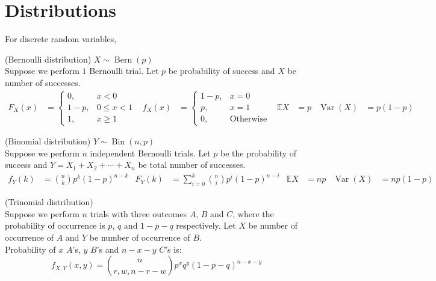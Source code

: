 \documentclass{huhtakm-template-book}
\newcommand{\expect}{\mathbb{E}}
\DeclareMathOperator{\Bern}{Bern}
\DeclareMathOperator{\Bin}{Bin}
\DeclareMathOperator{\Var}{Var}
\begin{document}
\section*{Distributions}
For discrete random variables,
\begin{seg}(Bernoulli distribution) $X\sim\Bern(p)$\\
	Suppose we perform $1$ Bernoulli trial. Let $p$ be probability of success and $X$ be number of successes.
	\begin{align*}
		F_{X}(x)&=\begin{cases}
			0, &x<0\\
			1-p, &0\leq x<1\\
			1, &x\geq 1
		\end{cases} & f_{X}(x)&=\begin{cases}
			1-p, &x=0\\
			p, &x=1\\
			0, &\text{Otherwise}
		\end{cases} & \expect X&=p & \Var(X)&=p(1-p)
	\end{align*}
\end{seg}
\begin{seg}(Binomial distribution) $Y\sim\Bin(n,p)$\\
	Suppose we perform $n$ independent Bernoulli trials. Let $p$ be the probability of success and $Y=X_{1}+X_{2}+\cdots+X_{n}$ be total number of successes.
	\begin{align*}
		f_{Y}(k)&=\binom{n}{k}p^{k}(1-p)^{n-k} & F_{Y}(k)&=\sum_{i=0}^{k}\binom{n}{i}p^{i}(1-p)^{n-i} & \expect X&=np & \Var(X)&=np(1-p)
	\end{align*}
\end{seg}
\begin{seg}(Trinomial distribution)\\
	Suppose we perform $n$ trials with three outcomes $A$, $B$ and $C$, where the probability of occurrence is $p$, $q$ and $1-p-q$ respectively. Let $X$ be number of occurrence of $A$ and $Y$ be number of occurrence of $B$.\\
	Probability of $x$ $A$'s, $y$ $B$'s and $n-x-y$ $C$'s is:
	\begin{equation*}
		f_{X,Y}(x,y)=\binom{n}{r,w,n-r-w}p^{x}q^{y}(1-p-q)^{n-x-y}
	\end{equation*}
\end{seg}
\end{document}
